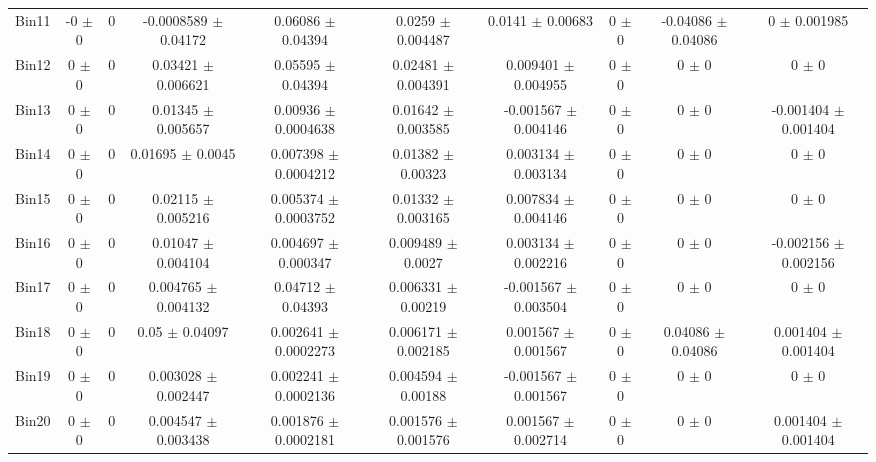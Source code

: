 \begin{tabular}{@{\extracolsep{4pt}}lccccccccc@{}}
     Bin11 & -0 $\pm$ 0 & 0 & -0.0008589 $\pm$ 0.04172 & 0.06086 $\pm$ 0.04394 & 0.0259 $\pm$ 0.004487 & 0.0141 $\pm$ 0.00683 & 0 $\pm$ 0 & -0.04086 $\pm$ 0.04086 & 0 $\pm$ 0.001985 \\ 
     Bin12 & 0 $\pm$ 0 & 0 & 0.03421 $\pm$ 0.006621 & 0.05595 $\pm$ 0.04394 & 0.02481 $\pm$ 0.004391 & 0.009401 $\pm$ 0.004955 & 0 $\pm$ 0 & 0 $\pm$ 0 & 0 $\pm$ 0 \\ 
     Bin13 & 0 $\pm$ 0 & 0 & 0.01345 $\pm$ 0.005657 & 0.00936 $\pm$ 0.0004638 & 0.01642 $\pm$ 0.003585 & -0.001567 $\pm$ 0.004146 & 0 $\pm$ 0 & 0 $\pm$ 0 & -0.001404 $\pm$ 0.001404 \\ 
     Bin14 & 0 $\pm$ 0 & 0 & 0.01695 $\pm$ 0.0045 & 0.007398 $\pm$ 0.0004212 & 0.01382 $\pm$ 0.00323 & 0.003134 $\pm$ 0.003134 & 0 $\pm$ 0 & 0 $\pm$ 0 & 0 $\pm$ 0 \\ 
     Bin15 & 0 $\pm$ 0 & 0 & 0.02115 $\pm$ 0.005216 & 0.005374 $\pm$ 0.0003752 & 0.01332 $\pm$ 0.003165 & 0.007834 $\pm$ 0.004146 & 0 $\pm$ 0 & 0 $\pm$ 0 & 0 $\pm$ 0 \\ 
     Bin16 & 0 $\pm$ 0 & 0 & 0.01047 $\pm$ 0.004104 & 0.004697 $\pm$ 0.000347 & 0.009489 $\pm$ 0.0027 & 0.003134 $\pm$ 0.002216 & 0 $\pm$ 0 & 0 $\pm$ 0 & -0.002156 $\pm$ 0.002156 \\ 
     Bin17 & 0 $\pm$ 0 & 0 & 0.004765 $\pm$ 0.004132 & 0.04712 $\pm$ 0.04393 & 0.006331 $\pm$ 0.00219 & -0.001567 $\pm$ 0.003504 & 0 $\pm$ 0 & 0 $\pm$ 0 & 0 $\pm$ 0 \\ 
     Bin18 & 0 $\pm$ 0 & 0 & 0.05 $\pm$ 0.04097 & 0.002641 $\pm$ 0.0002273 & 0.006171 $\pm$ 0.002185 & 0.001567 $\pm$ 0.001567 & 0 $\pm$ 0 & 0.04086 $\pm$ 0.04086 & 0.001404 $\pm$ 0.001404 \\ 
     Bin19 & 0 $\pm$ 0 & 0 & 0.003028 $\pm$ 0.002447 & 0.002241 $\pm$ 0.0002136 & 0.004594 $\pm$ 0.00188 & -0.001567 $\pm$ 0.001567 & 0 $\pm$ 0 & 0 $\pm$ 0 & 0 $\pm$ 0 \\ 
     Bin20 & 0 $\pm$ 0 & 0 & 0.004547 $\pm$ 0.003438 & 0.001876 $\pm$ 0.0002181 & 0.001576 $\pm$ 0.001576 & 0.001567 $\pm$ 0.002714 & 0 $\pm$ 0 & 0 $\pm$ 0 & 0.001404 $\pm$ 0.001404 \\ 
\hline\hline
  \end{tabular}
